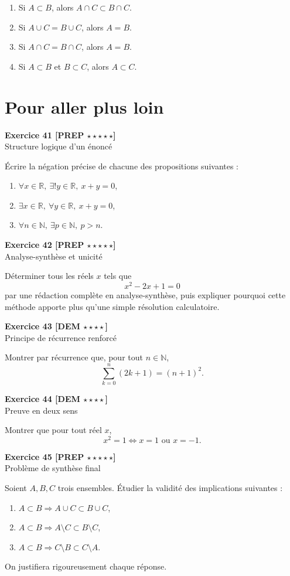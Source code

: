 \documentclass[11pt,a4paper]{article}
\newcommand{\R}{\mathbb{R}}
\newcommand{\N}{\mathbb{N}}
\begin{document}
\begin{enumerate}[label=\arabic*)]
    \item Si \(A\subset B\), alors \(A\cap C\subset B\cap C\).
    \item Si \(A\cup C=B\cup C\), alors \(A=B\).
    \item Si \(A\cap C=B\cap C\), alors \(A=B\).
    \item Si \(A\subset B\) et \(B\subset C\), alors \(A\subset C\).
\end{enumerate}

\section*{Pour aller plus loin}

\textbf{Exercice 41 [PREP \(\star\star\star\star\star\)]}\\
Structure logique d’un énoncé

Écrire la négation précise de chacune des propositions suivantes :
\begin{enumerate}[label=\alph*)]
    \item \(\forall x\in\R,\ \exists ! y\in\R,\ x+y=0\),
    \item \(\exists x\in\R,\ \forall y\in\R,\ x+y=0\),
    \item \(\forall n\in\N,\ \exists p\in\N,\ p>n\).
\end{enumerate}

\textbf{Exercice 42 [PREP \(\star\star\star\star\star\)]}\\
Analyse-synthèse et unicité

Déterminer tous les réels \(x\) tels que
\[
x^2-2x+1=0
\]
par une rédaction complète en analyse-synthèse, puis expliquer pourquoi cette méthode apporte plus qu’une simple résolution calculatoire.

\textbf{Exercice 43 [DEM \(\star\star\star\star\)]}\\
Principe de récurrence renforcé

Montrer par récurrence que, pour tout \(n\in\N\),
\[
\sum_{k=0}^n (2k+1)=(n+1)^2.
\]

\textbf{Exercice 44 [DEM \(\star\star\star\star\)]}\\
Preuve en deux sens

Montrer que pour tout réel \(x\),
\[
x^2=1 \Longleftrightarrow x=1 \text{ ou } x=-1.
\]

\textbf{Exercice 45 [PREP \(\star\star\star\star\star\)]}\\
Problème de synthèse final

Soient \(A,B,C\) trois ensembles. Étudier la validité des implications suivantes :
\begin{enumerate}[label=\alph*)]
    \item \(A\subset B \Longrightarrow A\cup C\subset B\cup C\),
    \item \(A\subset B \Longrightarrow A\setminus C\subset B\setminus C\),
    \item \(A\subset B \Longrightarrow C\setminus B\subset C\setminus A\).
\end{enumerate}
On justifiera rigoureusement chaque réponse.
\end{document}
